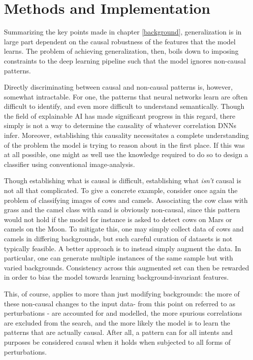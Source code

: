 \chapter{Methods and Implementation}
\setcounter{chapter}{3}
Summarizing the key points made in chapter \ref{background}, generalization is in large part dependent on the causal robustness of the features that the model learns. The problem of achieving generalization, then, boils down to imposing constraints to the deep learning pipeline such that the model ignores non-causal patterns.

Directly discriminating between causal and non-causal patterns is, however, somewhat intractable. For one, the patterns that neural networks learn are often difficult to identify, and even more difficult to understand semantically. Though the field of explainable AI has made significant progress in this regard, there simply is not a way to determine the causality of whatever correlation DNNs infer. Moreover, establishing  this causality necessitates a complete understanding of the problem the model is trying to reason about in the first place. If this was at all possible, one might as well use the knowledge required to do so to design a classifier using conventional image-analysis. 

Though establishing what is causal is difficult, establishing what \textit{isn't} causal is not all that complicated. To give a concrete example, consider once again the problem of classifying images of cows and camels. Associating the cow class with grass and the camel class with sand is obviously non-causal, since this pattern would not hold if the model for instance is asked to detect cows on Mars or camels on the Moon. To mitigate this, one may simply collect data of cows and camels in differing backgrounds, but such careful curation of datasets is not typically feasible. A better approach is to instead simply augment the data. In particular, one can generate multiple instances of the same sample but with varied backgrounds. Consistency across this augmented set can then be rewarded in order to bias the model towards learning background-invariant features. 

This, of course, applies to more than just modifying backgrounds: the more of these non-causal changes to the input data-  from this point on referred to as perturbations - are accounted for and modelled, the more spurious correlations are excluded from the search, and the more likely the model is to learn the patterns that are actually causal. After all, a pattern can for all intents and purposes be considered causal when it holds when subjected to all forms of perturbations. 

